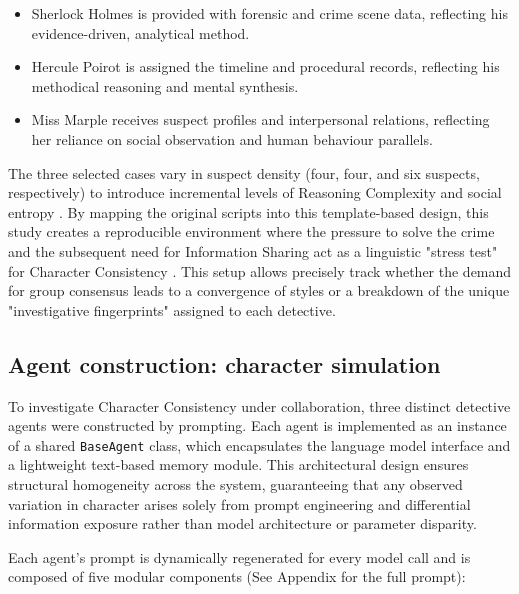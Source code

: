 \documentclass{article}
\begin{document}
\begin{itemize}
    \item Sherlock Holmes is provided with forensic and crime scene data, reflecting his evidence-driven, analytical method.
    \item Hercule Poirot is assigned the timeline and procedural records, reflecting his methodical reasoning and mental synthesis.
    \item Miss Marple receives suspect profiles and interpersonal relations, reflecting her reliance on social observation and human behaviour parallels.
\end{itemize}

The three selected cases vary in suspect density (four, four, and six suspects, respectively) to introduce incremental levels of Reasoning Complexity and social entropy \citep{baltaji2024cultured, guo2026collab}
. By mapping the original scripts into this template-based design, this study creates a reproducible environment where the pressure to solve the crime and the subsequent need for Information Sharing act as a linguistic "stress test" for Character Consistency \citep{park2023generative, guo2026collab}. This setup allows precisely track whether the demand for group consensus leads to a convergence of styles or a breakdown of the unique "investigative fingerprints" assigned to each detective.

\subsection{Agent construction: character simulation}

To investigate Character Consistency under collaboration,  three distinct detective agents were constructed by prompting. Each agent is implemented as an instance of a shared \texttt{BaseAgent} class, which encapsulates the language model interface and a lightweight text-based memory module. This architectural design ensures structural homogeneity across the system, guaranteeing that any observed variation in character arises solely from prompt engineering and differential information exposure rather than model architecture or parameter disparity.

Each agent’s prompt is dynamically regenerated for every model call and is composed of five modular components (See Appendix for the full prompt):
\end{document}
